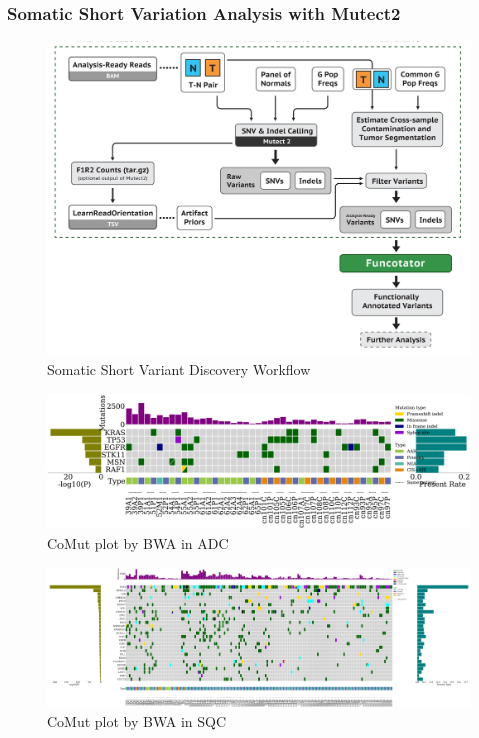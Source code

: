 \documentclass[11pt,a4paper,onecolumn,oneside]{report}
\begin{document}
            \subsubsection{Somatic Short Variation Analysis with Mutect2}
                \begin{figure}[p]
                    \centering
                    \includegraphics[width=0.6 \linewidth]{figures/Workflow/somatic_short_variants.png}
                    \caption{Somatic Short Variant Discovery Workflow \protect\cite{gatk1, gatk2}}
                    \label{fig:Mutect2}
                \end{figure}

                \begin{figure}[p]
                    \centering
                    \includegraphics[width=\linewidth]{figures/Mutect2/BWA-ADC.pdf}
                    \caption{CoMut plot by BWA in ADC}
                    \label{fig:comut-BWA-ADC}
                \end{figure}

                \begin{figure}[p]
                    \centering
                    \includegraphics[width=\linewidth]{figures/Mutect2/BWA-SQC.pdf}
                    \caption{CoMut plot by BWA in SQC}
                    \label{fig:comut-BWA-SQC}
                \end{figure}
\end{document}
